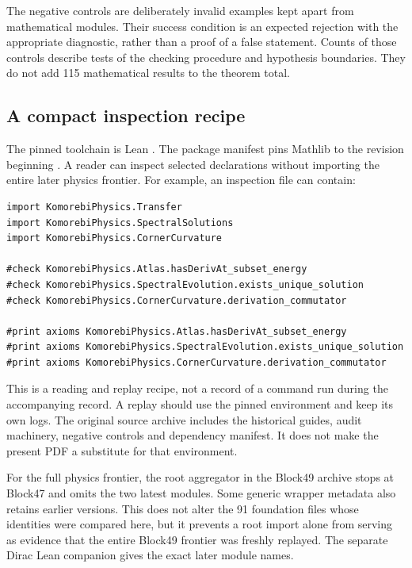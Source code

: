 The negative controls are deliberately invalid examples kept apart from mathematical modules. Their success condition is an expected rejection with the appropriate diagnostic, rather than a proof of a false statement. Counts of those controls describe tests of the checking procedure and hypothesis boundaries. They do not add 115 mathematical results to the theorem total.

\subsection{A compact inspection recipe}

The pinned toolchain is Lean . The package manifest pins Mathlib to the revision beginning . A reader can inspect selected declarations without importing the entire later physics frontier. For example, an inspection file can contain:

\begin{lstlisting}
import KomorebiPhysics.Transfer
import KomorebiPhysics.SpectralSolutions
import KomorebiPhysics.CornerCurvature

#check KomorebiPhysics.Atlas.hasDerivAt_subset_energy
#check KomorebiPhysics.SpectralEvolution.exists_unique_solution
#check KomorebiPhysics.CornerCurvature.derivation_commutator

#print axioms KomorebiPhysics.Atlas.hasDerivAt_subset_energy
#print axioms KomorebiPhysics.SpectralEvolution.exists_unique_solution
#print axioms KomorebiPhysics.CornerCurvature.derivation_commutator
\end{lstlisting}

This is a reading and replay recipe, not a record of a command run during the accompanying record. A replay should use the pinned environment and keep its own logs. The original source archive includes the historical guides, audit machinery, negative controls and dependency manifest. It does not make the present PDF a substitute for that environment.

For the full physics frontier, the root  aggregator in the Block49 archive stops at Block47 and omits the two latest modules. Some generic wrapper metadata also retains earlier versions. This does not alter the 91 foundation files whose identities were compared here, but it prevents a root import alone from serving as evidence that the entire Block49 frontier was freshly replayed. The separate Dirac Lean companion gives the exact later module names.

